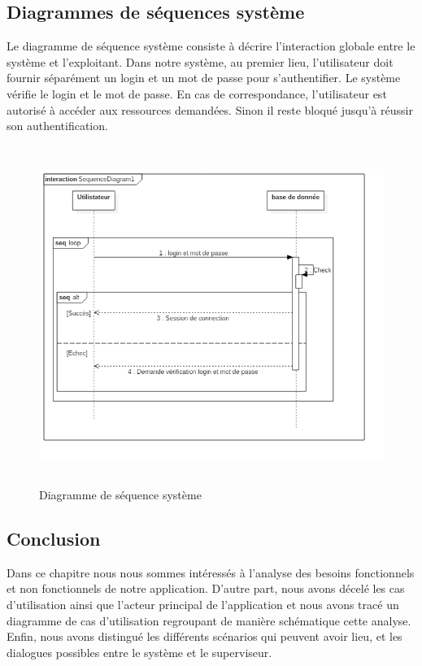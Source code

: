 \subsection{Diagrammes de séquences système}
Le diagramme de séquence système consiste à décrire l’interaction globale entre le système et l’exploitant. Dans notre système, au premier lieu, l’utilisateur doit fournir séparément un login et un mot de passe pour s’authentifier. Le système vérifie le login et le mot de passe. En cas de correspondance, l’utilisateur est autorisé à accéder aux ressources demandées. Sinon il reste bloqué jusqu’à réussir son authentification.
\begin{figure}[!h]
\begin{center}
\includegraphics[width=15cm,height=11cm]{Conception/SequenceDiagram2.png}
\end{center}
\caption{Diagramme de séquence système}
\end{figure}
\newpage
\subsection*{Conclusion}
Dans ce chapitre nous nous sommes intéressés à l'analyse des besoins fonctionnels et non fonctionnels de notre application. D'autre part, nous avons décelé les cas d'utilisation ainsi que l'acteur principal de l'application et nous avons tracé un diagramme de cas d'utilisation regroupant de manière schématique cette analyse. Enfin, nous avons distingué les différents scénarios qui peuvent avoir lieu, et les dialogues possibles entre le système et le superviseur.









